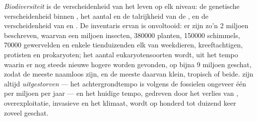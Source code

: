 \begin{definition}[Biodiversiteit]\label{def:b1:classifying-biodiversity:biodiversity}
\emph{Biodiversiteit} is de verscheidenheid van het leven op elk niveau: de
genetische verscheidenheid binnen , het aantal en de talrijkheid van
de , en de verscheidenheid van  en . De
inventaris ervan is onvoltooid: er zijn zo'n \num{2} miljoen 
beschreven, waarvan een miljoen insecten, \num{380000} planten,
\num{150000} schimmels, \num{70000} gewervelden en enkele tienduizenden elk
van weekdieren, kreeftachtigen, protisten en prokaryoten; het aantal
eukaryotensoorten wordt, uit het tempo waarin er nog steeds nieuwe hogere
 worden gevonden, op bijna \num{9} miljoen geschat, zodat de meeste
 naamloos zijn, en de meeste daarvan klein, tropisch of beide. 
zijn altijd \emph{uitgestorven} --- het achtergrondtempo is volgens de
fossielen ongeveer één  per miljoen per jaar --- en het huidige tempo,
gedreven door het verlies van , overexploitatie, invasieve 
en het klimaat, wordt op honderd tot duizend keer zoveel geschat.
\end{definition}

